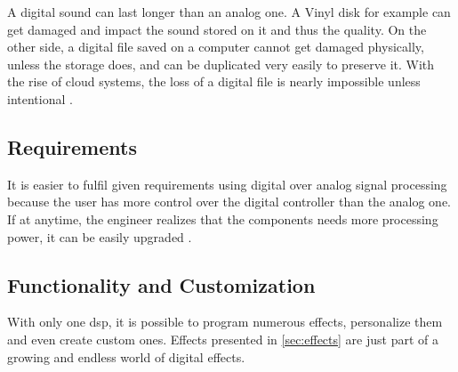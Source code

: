 A digital sound can last longer than an analog one. A Vinyl disk for example can get damaged and impact the sound stored on it and thus the quality. On the other side, a digital file saved on a computer cannot get damaged physically, unless the storage does, and can be duplicated very easily to preserve it. With the rise of cloud systems, the loss of a digital file is nearly impossible unless intentional \citep{analog_storage}.


\subsection{Requirements}

It is easier to fulfil given requirements using digital over analog signal processing because the user has more control over the digital controller than the analog one. If at anytime, the engineer realizes that the components needs more processing power, it can be easily upgraded \citep{analog_requirements}.

\subsection{Functionality and Customization}

With only one \gls{dsp}, it is possible to program numerous effects, personalize them and even create custom ones. Effects presented in \autoref{sec:effects} are just part of a growing and endless world of digital effects. 

 